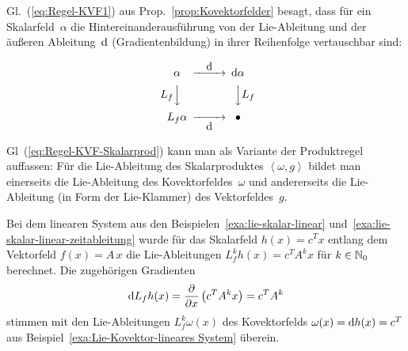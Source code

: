 Gl.~(\ref{eq:Regel-KVF1}) aus Prop.~\ref{prop:Kovektorfelder}
besagt, dass für ein Skalarfeld~$\alpha$ die Hintereinanderausführung
von der Lie-Ableitung und der äußeren Ableitung~${\mathrm{d}}$ 
(Gradientenbildung) in ihrer Reihenfolge vertauschbar sind:

\[
\begin{CD}
\alpha @>{\displaystyle\d}>> \d\alpha\\
@V{\displaystyle L_f}VV @VV{\displaystyle L_f}V\\
L_f\alpha @>>{\displaystyle\d}> \bullet
\end{CD}
\]

Gl~(\ref{eq:Regel-KVF-Skalarprod}) kann man als Variante der Produktregel
auffassen: Für die Lie-Ableitung des Skalarproduktes $\left\langle \omega,g\right\rangle $
bildet man einerseits die Lie-Ableitung des Kovektorfeldes~$\omega$
und andererseits die Lie-Ableitung (in Form der Lie-Klammer) des Vektorfeldes~$g$.

\begin{example}
\label{exa:Lie-linear-gradient}Bei dem linearen System aus den Beispielen~\ref{exa:lie-skalar-linear}
und~\ref{exa:lie-skalar-linear-zeitableitung} wurde für das Skalarfeld
$h(x)=c^{T}x$ entlang dem Vektorfeld $f(x)=A\,x$ die Lie-Ableitungen
$L_{f}^{k}h(x)=c^{T}A^{k}x$ für $k\in{\mathbb{N}_0}$ berechnet. Die zugehörigen
Gradienten 
\[
{\mathrm{d}} L_{f}h(x)=\frac{\partial}{\partial x}\left(c^{T}A^{k}x\right)=c^{T}A^{k}
\]
stimmen mit den Lie-Ableitungen $L_{f}^{k}\omega(x)$ des Kovektorfelds
$\omega(x)={\mathrm{d}} h(x)=c^{T}$ aus Beispiel~\ref{exa:Lie-Kovektor-lineares System}
überein.
\end{example}

